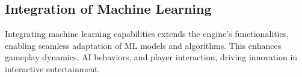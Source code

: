 \subsection*{Integration of Machine Learning}

Integrating machine learning capabilities extends the engine's functionalities, enabling seamless adaptation of ML models and algorithms. This enhances gameplay dynamics, AI behaviors, and player interaction, driving innovation in interactive entertainment.


\pagebreak
